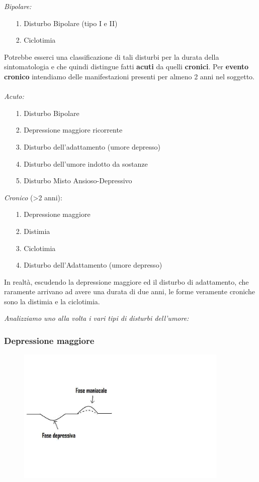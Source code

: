 \emph{Bipolare:}

\begin{itemize}
\item[1.]
  Disturbo Bipolare (tipo I e II)
\item[2.]
  Ciclotimia
\end{itemize}

Potrebbe esserci una classificazione di tali disturbi per la durata
della sintomatologia e che quindi distingue fatti \textbf{acuti} da
quelli \textbf{cronici}. Per \textbf{evento cronico} intendiamo delle
manifestazioni presenti per almeno 2 anni nel soggetto.
\\\\
\emph{Acuto:}

\begin{itemize}
\item[1.]
  Disturbo Bipolare
\item[2.]
  Depressione maggiore ricorrente
\item[3.]
  Disturbo dell'adattamento (umore depresso)
\item[4.]
  Disturbo dell'umore indotto da sostanze
\item[5.]
  Disturbo Misto Ansioso-Depressivo
\end{itemize}

\emph{Cronico} (\textgreater{}2 anni):

\begin{itemize}
\item[1.]
  Depressione maggiore
\item[2.]
  Distimia
\item[3.]
  Ciclotimia
\item[4.]
  Disturbo dell'Adattamento (umore depresso)
\end{itemize}

In realtà, escudendo la depressione maggiore ed il disturbo di
adattamento, che raramente arrivano ad avere una durata di due anni, le
forme veramente croniche sono la distimia e la ciclotimia.

\emph{Analizziamo uno alla volta i vari tipi di disturbi dell'umore:}

\subsubsection{Depressione maggiore}

\begin{figure}[!ht]
\centering
	\includegraphics[width=0.9\textwidth]{02/image1.jpeg}
\end{figure}

